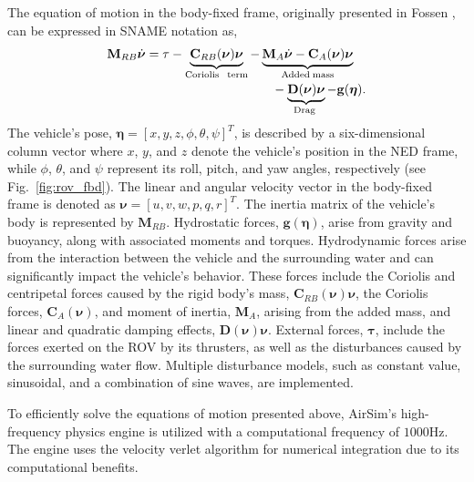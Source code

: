 The equation of motion in the body-fixed frame, originally presented in Fossen \cite{fossen}, can be expressed in SNAME notation \cite{SNAME} as, 
%
\begin{equation}\label{eq:eom}
  \begin{multlined}
    \mathbf{M}_{RB}\dot{\boldsymbol{\nu}}= \tau - \underbrace{ \mathbf{C}_{RB}(\boldsymbol{\nu})\boldsymbol{\nu} }_\text{Coriolis \hspace{1 pt} term} - \underbrace{ \mathbf{M}_A \dot{\boldsymbol{\nu}} - 
    \mathbf{C}_A(\boldsymbol{\nu}) \boldsymbol{\nu} }_\text{Added\hspace{2pt}mass}     
    \\
    - \underbrace{ \mathbf{D}(\boldsymbol{\nu}){\boldsymbol{\nu}} }_\text{Drag } - \mathbf{g}(\boldsymbol{\eta}).
  \end{multlined}
\end{equation}
%
The vehicle's pose, $\boldsymbol{\eta} = [x, y, z, \phi, \theta, \psi]^T$, is described by a six-dimensional column vector where $x$, $y$, and $z$ denote the vehicle's position in the \ac{NED} frame, while $\phi$, $\theta$, and $\psi$ represent its roll, pitch, and yaw angles, respectively (see Fig.~\ref{fig:rov_fbd}). 
The linear and angular velocity vector in the body-fixed frame is denoted as $\boldsymbol{\nu} = [u, v, w, p, q, r]^T$. 
The inertia matrix of the vehicle's body is represented by $\mathbf{M}_{RB}$. 
Hydrostatic forces, $\mathbf{g}(\boldsymbol{\eta})$, arise from gravity and buoyancy, along with associated moments and torques. 
Hydrodynamic forces arise from the interaction between the vehicle and the surrounding water and can significantly impact the vehicle's behavior. 
These forces include the Coriolis and centripetal forces caused by the rigid body's mass, $\mathbf{C}_{RB}(\boldsymbol{\nu})\boldsymbol{\nu}$, the Coriolis forces, $\mathbf{C}_A(\boldsymbol{\nu})$, and moment of inertia, $\mathbf{M}_{A}$, arising from the added mass, and linear and quadratic damping effects, $\mathbf{D}(\boldsymbol{\nu})\boldsymbol{\nu}$. 
External forces, $\boldsymbol{\tau}$, include the forces exerted on the \ac{ROV} by its thrusters, as well as the disturbances caused by the surrounding water flow. 
Multiple disturbance models, such as constant value, sinusoidal, and a combination of sine waves, are implemented.



To efficiently solve the equations of motion presented above, AirSim's high-frequency physics engine is utilized with a computational frequency of $1000 \textrm{Hz}$. The engine uses the velocity verlet algorithm for numerical integration due to its computational benefits.


